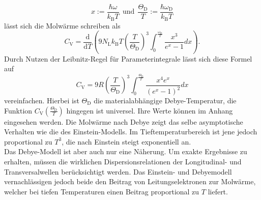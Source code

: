 \begin{equation}
  x := \frac{\hbar\omega}{k_{\text{B}}T} \:\: \text{und} \:\: \frac{\Theta_{\text{D}}}{T} := \frac{\hbar\omega_{\text{D}}}{k_{\text{B}}T} \label{eqn:4}
\end{equation}
lässt sich die Molwärme schreiben als
\begin{equation}
  C_{\text{V}} = \frac{\mathrm{d}}{\mathrm{d}T} \left( 9N_{\text{L}} k_{\text{B}}T \left(\frac{T}{\Theta_{\text{D}}}\right)^3 \int_{0}^{\frac{\omega_{\text{D}}}{T}}\frac{x^3}{e^x-1}dx\right).
\end{equation}
Durch Nutzen der Leibnitz-Regel für Parameterintegrale lässt sich diese Formel auf
\begin{equation}
  C_{\text{V}} = 9R \left(\frac{T}{\Theta_{\text{D}}}\right)^3 \int_{0}^{\frac{\Theta_{\text{D}}}{T}} \frac{x^4e^x}{\left(e^x-1\right)^2}dx
\end{equation}
vereinfachen.
Hierbei ist $\Theta_{\text{D}}$ die materialabhängige Debye-Temperatur, die Funktion $C_{\text{V}}\left(\frac{\Theta_{\text{D}}}{T}\right)$ hingegen ist universel.
Ihre Werte können im Anhang eingesehen werden.
Die Molwärme nach Debye zeigt das selbe asymptotische Verhalten wie die des Einstein-Modells.
Im Tieftemperaturbereich ist jene jedoch proportional zu $T^3$, die nach Einstein steigt exponentiell an.\\
Das Debye-Modell ist aber auch nur eine Näherung.
Um exakte Ergebnisse zu erhalten, müssen die wirklichen Dispersionsrelationen der Longitudinal- und Transversalwellen berücksichtigt werden.
Das Einstein- und Debyemodell vernachlässigen jedoch beide den Beitrag von Leitungselektronen zur Molwärme, welcher bei tiefen Temperaturen einen Beitrag proportional zu $T$ liefert.\cite{skript}
